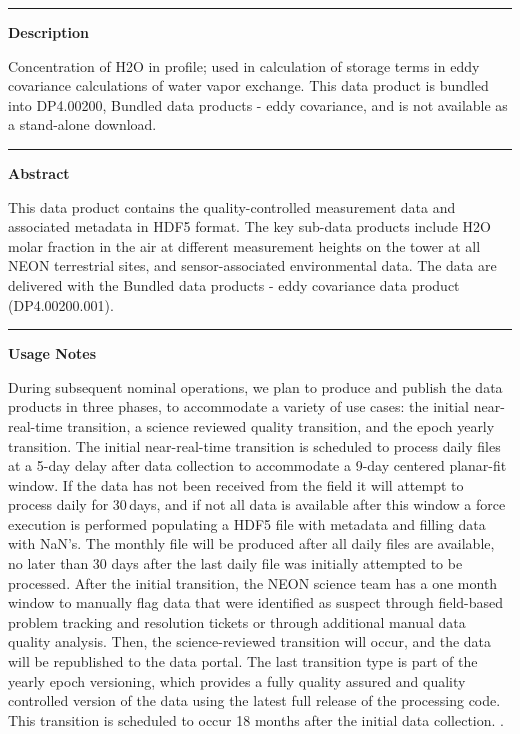 \documentclass[]{article}
\begin{document}
\begin{center}\rule{0.5\linewidth}{\linethickness}\end{center}

\textbf{Description}

Concentration of H2O in profile; used in calculation of storage terms in
eddy covariance calculations of water vapor exchange. This data product
is bundled into DP4.00200, Bundled data products - eddy covariance, and
is not available as a stand-alone download.

\begin{center}\rule{0.5\linewidth}{\linethickness}\end{center}

\textbf{Abstract}

This data product contains the quality-controlled measurement data and
associated metadata in HDF5 format. The key sub-data products include
H2O molar fraction in the air at different measurement heights on the
tower at all NEON terrestrial sites, and sensor-associated environmental
data. The data are delivered with the Bundled data products - eddy
covariance data product (DP4.00200.001).

\begin{center}\rule{0.5\linewidth}{\linethickness}\end{center}

\textbf{Usage Notes}

During subsequent nominal operations, we plan to produce and publish the
data products in three phases, to accommodate a variety of use cases:
the initial near-real-time transition, a science reviewed quality
transition, and the epoch yearly transition. The initial near-real-time
transition is scheduled to process daily files at a 5-day delay after
data collection to accommodate a 9-day centered planar-fit window. If
the data has not been received from the field it will attempt to process
daily for 30\,days, and if not all data is available after this window a
force execution is performed populating a HDF5 file with metadata and
filling data with NaN's. The monthly file will be produced after all
daily files are available, no later than 30 days after the last daily
file was initially attempted to be processed. After the initial
transition, the NEON science team has a one month window to manually
flag data that were identified as suspect through field-based problem
tracking and resolution tickets or through additional manual data
quality analysis. Then, the science-reviewed transition will occur, and
the data will be republished to the data portal. The last transition
type is part of the yearly epoch versioning, which provides a fully
quality assured and quality controlled version of the data using the
latest full release of the processing code. This transition is scheduled
to occur 18 months after the initial data collection. \newpage
.
\end{document}
